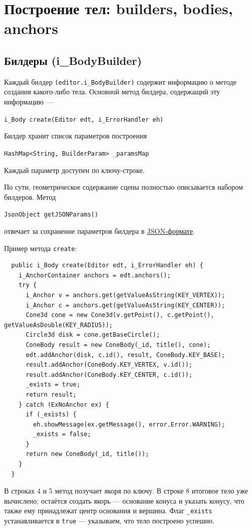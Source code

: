 \documentclass[fontsize=10px, a4paper, openany]{scrbook}
\newcommand{\codeline}[1]{\vspace{5px}\colorbox{light-gray}{\texttt{#1}}\vspace{5px}}
\begin{document}
\chapter{Построение тел: \textbf{builders}, \textbf{bodies}, \textbf{anchors}}

\section{Билдеры (i\_BodyBuilder)}
Каждый билдер \texttt{(editor.i\_BodyBuilder)} содержит информацию о методе создания какого-либо тела. Основной метод билдера, содержащий эту информацию ---

\codeline{i\_Body create(Editor edt, i\_ErrorHandler eh)}

Билдер хранит список параметров построения

\codeline{HashMap<String, BuilderParam> \_paramsMap}

Каждый параметр доступен по ключу-строке.

По сути, геометрическое содержание сцены полностью описывается набором билдеров. Метод

\codeline{JsonObject getJSONParams()}

отвечает за сохранение параметров билдера в \href{http://json.org/}{JSON-формате}.

Пример метода \texttt{create}:

\begin{lstlisting}
  public i_Body create(Editor edt, i_ErrorHandler eh) {
    i_AnchorContainer anchors = edt.anchors();
    try {
      i_Anchor v = anchors.get(getValueAsString(KEY_VERTEX));
      i_Anchor c = anchors.get(getValueAsString(KEY_CENTER));
      Cone3d cone = new Cone3d(v.getPoint(), c.getPoint(), getValueAsDouble(KEY_RADIUS));
      Circle3d disk = cone.getBaseCircle();
      ConeBody result = new ConeBody(_id, title(), cone);
      edt.addAnchor(disk, c.id(), result, ConeBody.KEY_BASE);
      result.addAnchor(ConeBody.KEY_VERTEX, v.id());
      result.addAnchor(ConeBody.KEY_CENTER, c.id());
      _exists = true;
      return result;
    } catch (ExNoAnchor ex) {
      if (_exists) {
        eh.showMessage(ex.getMessage(), error.Error.WARNING);
        _exists = false;
      }
      return new ConeBody(_id, title());
    }
  }
\end{lstlisting}

В строках 4 и 5 метод получает якоря по ключу. В строке 8 итоговое тело уже вычислено; остаётся создать якорь --- основание конуса и указать конусу, что также ему принадлежат центр основания и вершина. Флаг \texttt{\_exists} устанавливается в \texttt{true} --- указываем, что тело построено успешно.
\end{document}
